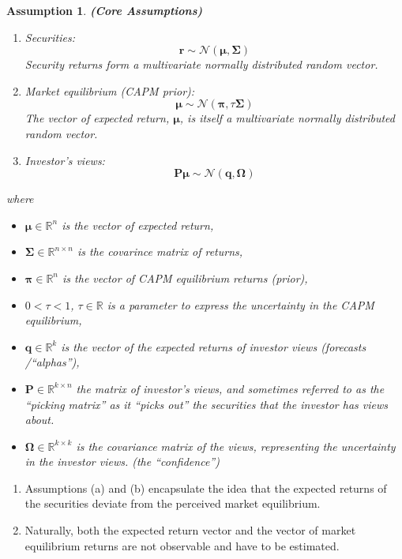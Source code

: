 \documentclass[13pt]{article}
\newtheorem{assumption}[theorem]{Assumption}
\theoremstyle{definition}
\theoremstyle{remark}
\newenvironment{remark}
  {\pushQED{\qed}\renewcommand{\qedsymbol}{$\triangle$}\remarkx}
  {\popQED\endremarkx}
\begin{document}
\begin{assumption}\textbf{(Core Assumptions)}\hfill
\begin{enumerate}[label=(\alph*)]
    \item Securities:
$$
\bm{r} \sim \mathcal{N}(\bm{\mu}, \mathbf{\Sigma})
$$
Security returns form a multivariate normally
distributed random
vector.
\item Market equilibrium (CAPM prior):
$$
\bm{\mu} \sim \mathcal{N}(\bm{\pi}, \tau \mathbf{\Sigma})
$$
The vector of expected return, $\bm{\mu}$, is itself a multivariate normally distributed random
vector.
\item Investor's views:
$$
\mathbf{P} \bm{\mu} \sim \mathcal{N}(\bm{q}, \mathbf{\Omega})
$$
\end{enumerate}
where
\begin{itemize}
  \item $\bm{\mu} \in \mathbb{R}^{n}$ is the vector of expected return,

  \item $\mathbf{\Sigma} \in \mathbb{R}^{n \times n}$ is the covarince matrix of returns,

  \item $\bm{\pi} \in \mathbb{R}^{n}$ is the vector of CAPM equilibrium returns (prior),

\item $0< \tau<1$, $\tau\in \mathbb{R}$ is a parameter to express the uncertainty in the CAPM equilibrium,

  \item $\bm{q} \in \mathbb{R}^{k}$ is the vector of the expected returns of investor views (forecasts /``alphas''),

  \item $\mathbf{P} \in \mathbb{R}^{k \times n}$ the matrix of investor's views, and sometimes referred to as the ``picking matrix'' as it ``picks out'' the securities that the investor has views about.

    \item $\mathbf{\Omega} \in \mathbb{R}^{k \times k}$  is the covariance matrix of the views, representing the uncertainty in the investor views. (the ``confidence'')
\end{itemize}
\end{assumption}
\begin{remark}\hfill
\begin{enumerate}
    \item Assumptions (a) and (b) encapsulate the idea that the expected returns of the securities deviate from the perceived market equilibrium. 
    \item Naturally, both the expected return vector and the vector of market equilibrium returns are not observable and have to be estimated.
\end{enumerate}
\end{remark}
\end{document}

